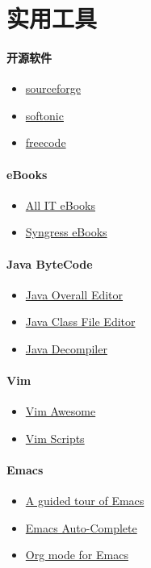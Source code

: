 
\section{实用工具}
\paragraph{开源软件}
\begin{itemize}
	\item \href{http://sourceforge.net/}{sourceforge}
	\item \href{https://en.softonic.com/}{softonic}
	\item \href{http://freecode.com/}{freecode}
\end{itemize}
\paragraph{eBooks}
\begin{itemize}
	\item \href{http://www.allitebooks.com/}{All IT eBooks}
	\item \href{https://ebooks-it.org/syngress-1.htm}{Syngress eBooks}
\end{itemize}
\paragraph{Java ByteCode}
\begin{itemize}
	\item \href{http://dirty-joe.com/}{Java Overall Editor}
	\item \href{http://classeditor.sourceforge.net/}{Java Class File Editor}
	\item \href{http://java-decompiler.github.io/}{Java Decompiler}
\end{itemize}
\paragraph{Vim}
\begin{itemize}
	\item \href{http://vimawesome.com/}{Vim Awesome}
	\item \href{http://vim-scripts.org/vim/scripts.html}{Vim Scripts}
\end{itemize}
\paragraph{Emacs}
\begin{itemize}
	\item \href{http://www.gnu.org/software/emacs/tour/index.html}{A guided tour of Emacs}
	\item \href{https://github.com/auto-complete}{Emacs Auto-Complete}
	\item \href{http://orgmode.org/}{Org mode for Emacs}
\end{itemize}
